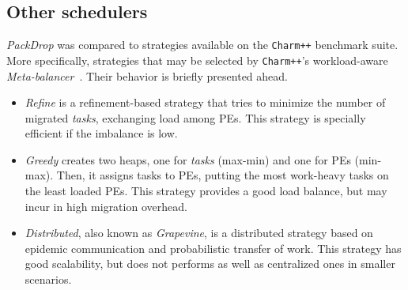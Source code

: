 \subsection{Other schedulers}

\textit{PackDrop} was compared to strategies available on the \texttt{Charm++} benchmark suite.
More specifically, strategies that may be selected by \texttt{Charm++}'s workload-aware \textit{Meta-balancer}~\cite{MenonPHD}.
Their behavior is briefly presented ahead.

\begin{itemize}
	\item \textit{Refine} is a refinement-based strategy that tries to minimize the number of migrated \textit{tasks}, exchanging load among PEs.
This strategy is specially efficient if the imbalance is low.
	\item \textit{Greedy} creates two heaps, one for \textit{tasks} (max-min) and one for PEs (min-max). 
Then, it assigns tasks to PEs, putting the most work-heavy tasks on the least loaded PEs.
This strategy provides a good load balance, but may incur in high migration overhead.
    \item \textit{Distributed}, also known as \textit{Grapevine}, is a distributed strategy based on epidemic communication and probabilistic transfer of work.
   This strategy has good scalability, but does not performs as well as centralized ones in smaller scenarios.

\end{itemize}



